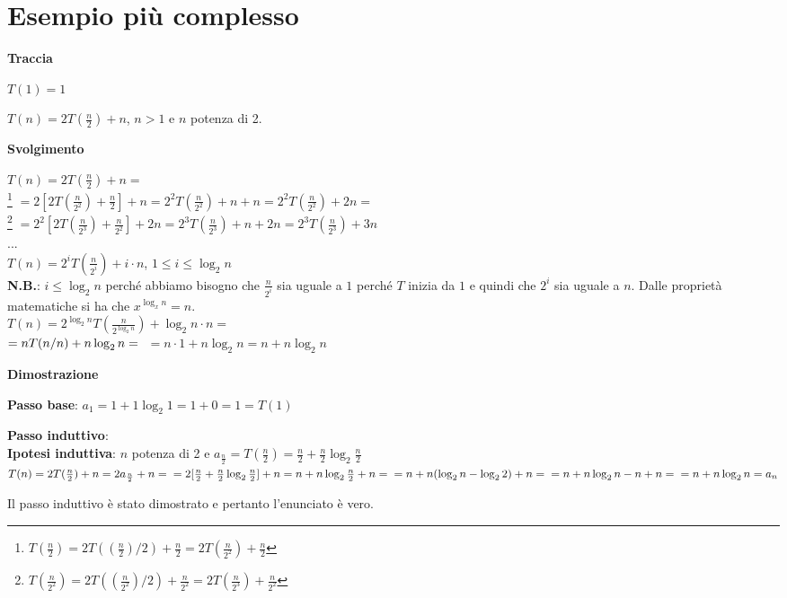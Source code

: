 \section{Esempio più complesso}
\begin{example}
\phantom{}
\centerline{\textbf{Traccia}}

$T(1) = 1$

$T(n) = 2T(\frac{n}{2}) + n$, $n > 1$ e $n$ potenza di 2.

\centerline{\textbf{Svolgimento}}
$T(n) = 2T(\frac{n}{2}) + n =$ \\ \footnote{$T(\frac{n}{2}) = 2T((\frac{n}{2})/2) + \frac{n}{2} = 2T(\frac{n}{2^2}) + \frac{n}{2}$}
$= 2[2T(\frac{n}{2^2}) + \frac{n}{2}] + n = 2^2T(\frac{n}{2^2}) + n + n = 2^2T(\frac{n}{2^2}) + 2n =$ \\ \footnote{$T(\frac{n}{2^2}) = 2T((\frac{n}{2^2})/2) + \frac{n}{2^2} = 2T(\frac{n}{2^3}) + \frac{n}{2^2}$}
$= 2^2[2T(\frac{n}{2^3}) + \frac{n}{2^2}] + 2n = 2^3T(\frac{n}{2^3}) + n + 2n = 2^3T(\frac{n}{2^3}) + 3n$ \\
... \\
$T(n) = 2^i T(\frac{n}{2^i}) + i \cdot n$, $1 \le i \le \log_{2} n$ \\
\textbf{N.B.}: $i \le \log_{2} n$ perché abbiamo bisogno che $\frac{n}{2^i}$ sia uguale a $1$ perché $T$ inizia da $1$ e quindi che $2^i$ sia uguale a $n$. Dalle proprietà matematiche si ha che $x^{\log_{x} n} = n$. \\
$T(n) = 2^{\log_{2} n} T(\frac{n}{2^{\log_{2} n}}) + \log_{2} n \cdot n =$ \\
$= nT(n/n) + n\log_{2} n = \\$
$= n \cdot 1 + n\log_{2} n = n + n\log_{2} n$

\centerline{\textbf{Dimostrazione}}

\textbf{Passo base}: $a_1 = 1 + 1\log_{2} 1 = 1 + 0 = 1 = T(1)$

\textbf{Passo induttivo}: \\
\textbf{Ipotesi induttiva}: $n$ potenza di 2 e $a_{\frac{n}{2}} = T(\frac{n}{2}) = \frac{n}{2} + \frac{n}{2}\log_{2} \frac{n}{2}$ \\
$T(n) = 2T(\frac{n}{2}) + n = 2a_{\frac{n}{2}} + n = \\
= 2[\frac{n}{2} + \frac{n}{2}\log_{2} \frac{n}{2}] + n \\
= n + n\log_{2} \frac{n}{2} + n = \\
= n + n(\log_{2} n - \log_{2} 2) + n = \\
= n + n\log_{2} n - n + n = \\
= n + n\log_{2} n = a_n$

Il passo induttivo è stato dimostrato e pertanto l'enunciato è vero.

\end{example}
